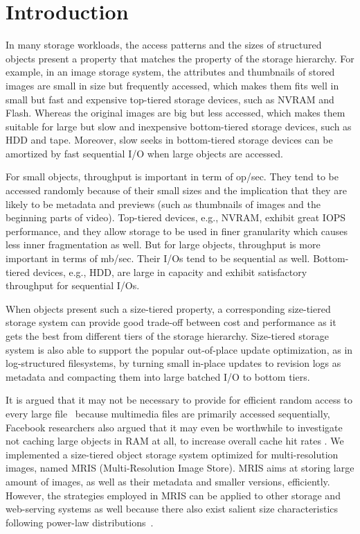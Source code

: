 \section{Introduction}
\label{intro}

In many storage workloads, the access patterns and the sizes of
structured objects present a property that matches the property of the
storage hierarchy. For example, in an image storage system, the
attributes and thumbnails of stored images are small in size but
frequently accessed, which makes them fits well in small but fast and
expensive top-tiered storage devices, such as NVRAM and Flash.
Whereas the original images are big but less accessed, which makes
them suitable for large but slow and inexpensive bottom-tiered storage
devices, such as HDD and tape.  Moreover, slow seeks in bottom-tiered
storage devices can be amortized by fast sequential I/O when large
objects are accessed.

For small objects, throughput is important in term of op/sec. They
tend to be accessed randomly because of their small sizes and the
implication that they are likely to be metadata and previews (such as
thumbnails of images and the beginning parts of video).
Top-tiered devices, e.g., NVRAM, exhibit great IOPS performance, and
they allow storage to be used in finer granularity which causes less
inner fragmentation as well. But for large objects, throughput is more
important in terms of mb/sec. Their I/Os tend to be sequential as
well. Bottom-tiered devices, e.g., HDD, are large in capacity and
exhibit satisfactory throughput for sequential I/Os. 


When objects present such a size-tiered property, a corresponding
size-tiered storage system can provide good trade-off between cost and
performance as it gets the best from different tiers of the storage
hierarchy. Size-tiered storage system is also able to support the
popular out-of-place update optimization, as in log-structured
filesystems, by turning small in-place updates to revision logs as
metadata and compacting them into large batched I/O to bottom tiers.

It is argued that it may not be necessary to provide for efficient
random access to every large file~\cite{evans2002study} because
multimedia files are primarily accessed sequentially, Facebook
researchers also argued that it may even be worthwhile to investigate
not caching large objects in RAM at all, to increase overall cache hit
rates \cite{kvworkload_sigmetrics}.  We implemented a size-tiered
object storage system optimized for multi-resolution images, named
MRIS (Multi-Resolution Image Store).  MRIS aims at storing large
amount of images, as well as their metadata and smaller versions,
efficiently. However, the strategies employed in MRIS can be applied
to other storage and web-serving systems as well because there also
exist salient size characteristics following power-law
distributions~\cite{kvworkload_sigmetrics}.

